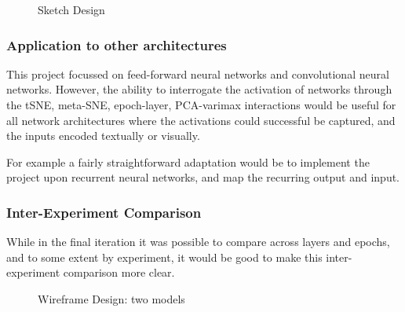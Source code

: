 \documentclass[a4paper,11pt,titlepage]{article}
\begin{document}
	\begin{figure}[H]
    			\caption{Sketch Design}%
	\end{figure}	
	
	\subsubsection{Application to other architectures}
	This project focussed on feed-forward neural networks and convolutional neural networks. However, the ability to interrogate the activation of networks through the tSNE, meta-SNE, epoch-layer, PCA-varimax interactions would be useful for all network architectures where the activations could successful be captured, and the inputs encoded textually or visually.
	\par 
	For example a fairly straightforward adaptation would be to implement the project upon recurrent neural networks, and map the recurring output and input.

	\subsubsection{Inter-Experiment Comparison}
	While in the final iteration it was possible to compare across layers and epochs, and to some extent by experiment, it would be good to make this inter-experiment comparison more clear.
	\par 
		
	\begin{figure}[H]
    			\caption{Wireframe Design: two models}%
	\end{figure}	
	
\end{document}
